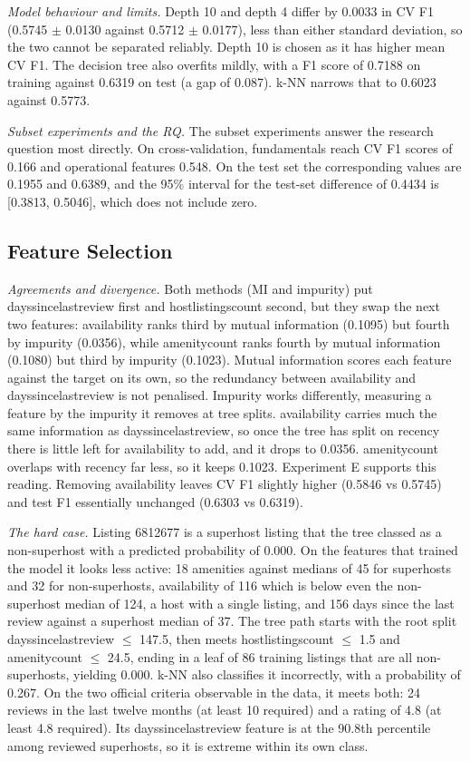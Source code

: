 \documentclass[final,1p,11pt]{elsarticle}
\renewcommand\_{\textunderscore\allowbreak}%
\begin{document}
\textit{Model behaviour and limits.} Depth 10 and depth 4 differ by 0.0033 in CV F1 (0.5745 $\pm$ 0.0130 against 0.5712 $\pm$ 0.0177), less than either standard deviation, so the two cannot be separated reliably. Depth 10 is chosen as it has higher mean CV F1. The decision tree also overfits mildly, with a F1 score of 0.7188 on training against 0.6319 on test (a gap of 0.087). k-NN narrows that to 0.6023 against 0.5773.

\textit{Subset experiments and the RQ.} The subset experiments answer the research question most directly. On cross-validation, fundamentals reach CV F1 scores of 0.166 and operational features 0.548. On the test set the corresponding values are 0.1955 and 0.6389, and the 95\% interval for the test-set difference of 0.4434 is [0.3813, 0.5046], which does not include zero.

\subsection{Feature Selection}

\textit{Agreements and divergence.} Both methods (MI and impurity) put days\_since\_last\_review first and host\_listings\_count second, but they swap the next two features: availability\_365 ranks third by mutual information (0.1095) but fourth by impurity (0.0356), while amenity\_count ranks fourth by mutual information (0.1080) but third by impurity (0.1023). Mutual information scores each feature against the target on its own, so the redundancy between availability\_365 and days\_since\_last\_review is not penalised. Impurity works differently, measuring a feature by the impurity it removes at tree splits. availability\_365 carries much the same information as days\_since\_last\_review, so once the tree has split on recency there is little left for availability\_365 to add, and it drops to 0.0356. amenity\_count overlaps with recency far less, so it keeps 0.1023. Experiment E supports this reading. Removing availability\_365 leaves CV F1 slightly higher (0.5846 vs 0.5745) and test F1 essentially unchanged (0.6303 vs 0.6319).

\textit{The hard case.} Listing 6812677 is a superhost listing that the tree classed as a non-superhost with a predicted probability of 0.000. On the features that trained the model it looks less active: 18 amenities against medians of 45 for superhosts and 32 for non-superhosts, availability of 116 which is below even the non-superhost median of 124, a host with a single listing, and 156 days since the last review against a superhost median of 37. The tree path starts with the root split days\_since\_last\_review $\leq$ 147.5, then meets host\_listings\_count $\leq$ 1.5 and amenity\_count $\leq$ 24.5, ending in a leaf of 86 training listings that are all non-superhosts, yielding 0.000. k-NN also classifies it incorrectly, with a probability of 0.267. On the two official criteria observable in the data, it meets both: 24 reviews in the last twelve months (at least 10 required) and a rating of 4.8 (at least 4.8 required). Its days\_since\_last\_review feature is at the 90.8th percentile among reviewed superhosts, so it is extreme within its own class.
\end{document}
